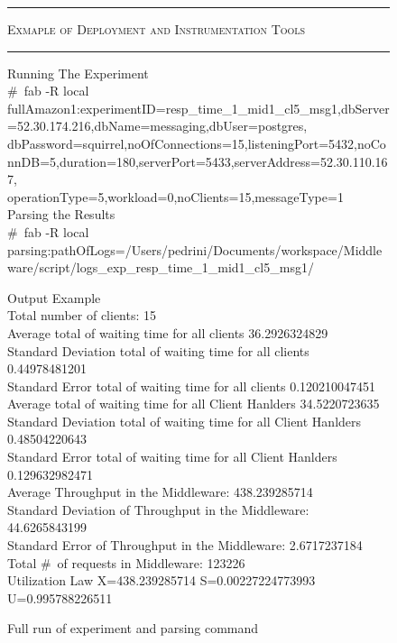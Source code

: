  \begin{figure}[h!]
 	\begin{boxedminipage}{\textwidth}
 	\tiny
 	\rule{\textwidth}{0.5pt}
 	\textsc{Exmaple of Deployment and Instrumentation Tools}\\
 	\rule{\textwidth}{0.5pt}
   Running The Experiment\\
   \#\  fab -R local fullAmazon1:experimentID=resp\_time\_1\_mid1\_cl5\_msg1,dbServer=52.30.174.216,dbName=messaging,dbUser=postgres,\\dbPassword=squirrel,noOfConnections=15,listeningPort=5432,noConnDB=5,duration=180,serverPort=5433,serverAddress=52.30.110.167,\\operationType=5,workload=0,noClients=15,messageType=1 \\
   
   Parsing the Results\\
   \#\ fab -R local parsing:pathOfLogs=/Users/pedrini/Documents/workspace/Middleware/script/logs\_exp\_resp\_time\_1\_mid1\_cl5\_msg1/
   
   Output Example\\
   Total number of clients:	15\\
   
   Average total of waiting time for all clients	36.2926324829\\
   Standard Deviation total of waiting time for all clients	0.44978481201\\
   Standard Error total of waiting time for all clients	0.120210047451\\
   
   Average total of waiting time for all Client Hanlders	34.5220723635\\
   Standard Deviation total of waiting time for all Client Hanlders	0.48504220643\\
   Standard Error total of waiting time for all Client Hanlders	0.129632982471\\
   
   
   Average Throughput in the Middleware:	438.239285714\\
   Standard Deviation of Throughput in the Middleware:	44.6265843199\\
   Standard Error of Throughput in the Middleware:	2.6717237184\\
   Total \#\ of requests in Middleware:	123226\\
   
   Utilization Law 	X=438.239285714	S=0.00227224773993	U=0.995788226511\\
  
   \end{boxedminipage}
   	\caption{Full run of experiment and parsing command}
   	\label{fig:deploy}
 \end{figure}
 
